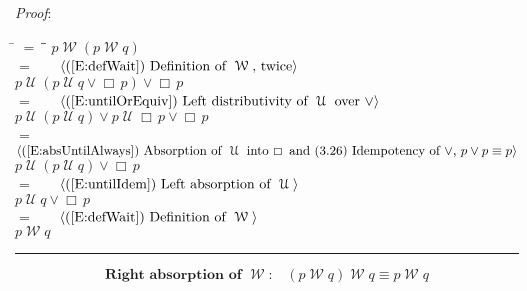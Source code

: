 \documentclass[12pt, fleqn, leqno]{article}
\newcommand{\lgap}{2pt}                             %
\newcommand{\mymathindent}{24pt}                    %
\newcommand{\Until}{\;\mathcal{U}\;}
\newcommand{\Wait}{\;\mathcal{W}\;}
\newcommand{\Always}{\Box\,}
\newcommand{\myqed}{\rule[-.23ex]{1.2ex}{2.0ex}}
\newcommand{\myqedtab}{\hspace{384pt}}              %
\newcommand{\Gll} {\langle}                         %
\newcommand{\Ggg} {\rangle}                         %
\newcommand{\Hint}[1]     {\ \ \ $\Gll              \mbox{#1} \Ggg$ }   %
\begin{document}
\emph{Proof}:
\begin{tabbing}
\hspace{\mymathindent} \= $= \;$ \= \myqedtab \= \kill
  \> \>   $p \Wait (p \Wait q)$\\[\lgap]
\> $=$ \> \Hint{(\ref{E:defWait}) Definition of $\Wait$, twice} \\[\lgap]
  \> \>   $p \Until (p \Until q \lor \Always p) \lor \Always p$\\[\lgap]
  \> $=$  \>  \Hint{(\ref{E:untilOrEquiv}) Left distributivity of $\Until$ over $\lor$}\\[\lgap]
  \> \>   $p \Until (p \Until q) \lor p\Until \Always p \lor \Always p$\\[\lgap]
  \> $=$  \>  \Hint{(\ref{E:absUntilAlways}) Absorption of $\Until$ into $\Always$ and (3.26) Idempotency of $\lor$, $p\lor p \equiv p$}\\[\lgap]
  \> \>   $p \Until (p \Until q) \lor \Always p$\\[\lgap]
  \> $=$  \>  \Hint{(\ref{E:untilIdem}) Left absorption of $\Until$}\\[\lgap]
  \> \>   $p \Until q \lor \Always p$\\[\lgap]
\> $=$ \> \Hint{(\ref{E:defWait}) Definition of $\Wait$} \\[\lgap]
  \> \>   $p \Wait q$ \quad \myqed
\end{tabbing}
\begin{equation}\label{E:waitAbsR}
\textbf{Right absorption of $\Wait$:}\quad (p \Wait q) \Wait q \equiv p \Wait q
\end{equation}
\end{document}
